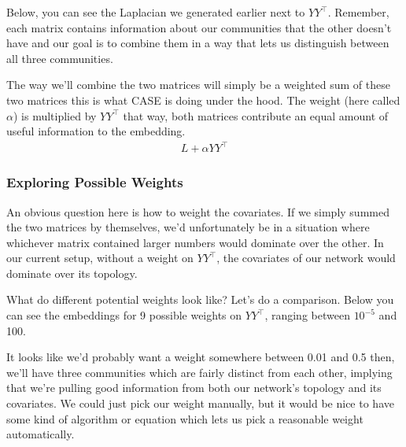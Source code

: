 \documentclass[letterpaper,10pt,english]{jupyterBook}
\begin{document}
\sphinxAtStartPar
Below, you can see the Laplacian we generated earlier next to \(YY^\top\). Remember, each matrix contains information about our communities that the other doesn’t have \sphinxhyphen{} and our goal is to combine them in a way that lets us distinguish between all three communities.

\noindent{}

\sphinxAtStartPar
The way we’ll combine the two matrices will simply be a weighted sum of these two matrices \sphinxhyphen{} this is what CASE is doing under the hood. The weight (here called \(\alpha\)) is multiplied by \(YY^\top\) \sphinxhyphen{} that way, both matrices contribute an equal amount of useful information to the embedding.
\begin{equation*}
\begin{split}
L + \alpha YY^\top
\end{split}
\end{equation*}

\subsubsection{Exploring Possible Weights}
\label{\detokenize{representations/ch6/joint-representation-learning:exploring-possible-weights}}
\sphinxAtStartPar
An obvious question here is how to weight the covariates. If we simply summed the two matrices by themselves, we’d unfortunately be in a situation where whichever matrix contained larger numbers would dominate over the other. In our current setup, without a weight on \(YY^\top\), the covariates of our network would dominate over its topology.

\noindent{}

\sphinxAtStartPar
What do different potential weights look like? Let’s do a comparison. Below you can see the embeddings for 9 possible weights on \(YY^\top\), ranging between \(10^{-5}\) and 100.

\noindent{}

\sphinxAtStartPar
It looks like we’d probably want a weight somewhere between 0.01 and 0.5  \sphinxhyphen{} then, we’ll have three communities which are fairly distinct from each other, implying that we’re pulling good information from both our network’s topology and its covariates. We could just pick our weight manually, but it would be nice to have some kind of algorithm or equation which lets us pick a reasonable weight automatically.
\end{document}

